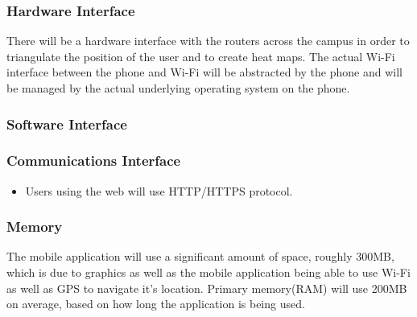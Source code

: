 \documentclass{article}
\begin{document}
            \subsubsection{Hardware Interface}
		{There will be a hardware interface with the routers across the campus in order to triangulate the position of the user and to create heat maps. The actual Wi-Fi interface between the phone and Wi-Fi will be abstracted by the phone and will be managed by the actual underlying operating system on the phone.}
            \subsubsection{Software Interface}
            
            \subsubsection{Communications Interface} \begin{itemize}
	    \item Users using the web will use HTTP/HTTPS protocol.
	    \end{itemize}
            \subsubsection{Memory}
	    {The mobile application will use a significant amount of space, roughly 300MB, which is due to graphics as well as the mobile application being able to use Wi-Fi as well as GPS to navigate it's location. Primary memory(RAM) will use 200MB on average, based on how long the application is being used.}
\end{document}
